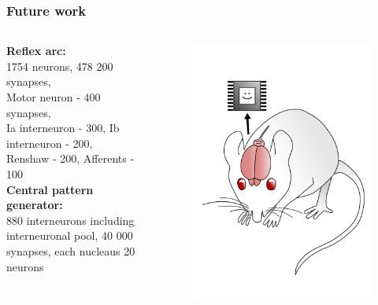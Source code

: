 \documentclass[12pt, aspectratio=169]{beamer}
\begin{document}
\begin{frame}
  \frametitle{Future work}
\begin{columns}[c]

\textbf{Reflex arc:}\\
1754 neurons, 478 200 synapses,\\
Motor neuron - 400 synapses,\\
Ia interneuron - 300,
Ib interneuron - 200,\\
Renshaw - 200,
Afferents - 100\\

\textbf{Central pattern generator:}\\
880 interneurons including interneuronal pool,
40 000 synapses,
each nucleaus 20 neurons

\begin{figure}
\includegraphics[width=1.0\linewidth]{mousebrainpink}
\end{figure}
\end{columns}
\end{frame}

\end{document}
